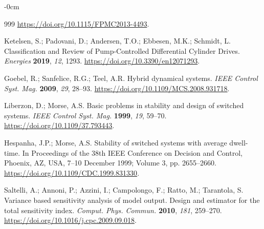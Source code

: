 \documentclass[machines,article,submit,pdftex,moreauthors]{Definitions/mdpi}
\begin{document}
\begin{adjustwidth}{-\extralength}{0cm}
\begin{thebibliography}{999}
 \url{https://doi.org/10.1115/FPMC2013-4493}.


 Ketelsen, S.; Padovani, D.; Andersen, T.O.; Ebbesen, M.K.; Schmidt, L. Classification and Review of Pump-Controlled Differential Cylinder Drives. \emph{Energies} \textbf{2019}, \emph{12}, 1293. \url{https://doi.org/10.3390/en12071293}.




 Goebel, R.; Sanfelice, R.G.; Teel, A.R. Hybrid dynamical systems. \emph{IEEE Control Syst. Mag.} \textbf{2009}, \emph{29}, 28--93. \url{https://doi.org/10.1109/MCS.2008.931718}.


 Liberzon, D.; Morse, A.S. Basic problems in stability and design of switched systems. \emph{IEEE Control Syst. Mag.} \textbf{1999}, \emph{19}, 59--70. \url{https://doi.org/10.1109/37.793443}.


 Hespanha, J.P.; Morse, A.S. Stability of switched systems with average dwell-time. In Proceedings of the 38th IEEE Conference on Decision and Control, Phoenix, AZ, USA, 7--10 December 1999; Volume 3, pp. 2655--2660. \url{https://doi.org/10.1109/CDC.1999.831330}.


 Saltelli, A.; Annoni, P.; Azzini, I.; Campolongo, F.; Ratto, M.; Tarantola, S. Variance based sensitivity analysis of model output. Design and estimator for the total sensitivity index. \emph{Comput. Phys. Commun.} \textbf{2010}, \emph{181}, 259--270. \url{https://doi.org/10.1016/j.cpc.2009.09.018}.
\end{thebibliography}

\PublishersNote{}
\end{adjustwidth}
\end{document}

